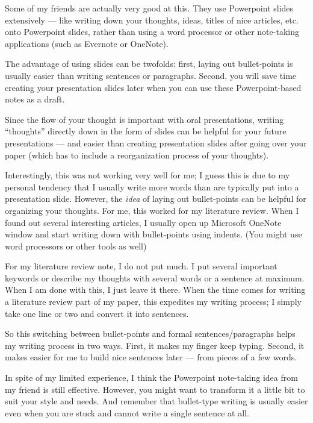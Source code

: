 \documentclass[11pt]{article}
\begin{document}
Some of my friends are actually very good at this. They use Powerpoint slides
extensively --- like writing down your thoughts, ideas, titles of nice
articles, etc. onto Powerpoint slides, rather than using a word processor or
other note-taking applications (such as Evernote or OneNote).

The advantage of using slides can be twofolds: first, laying out bullet-points
is usually easier than writing sentences or paragraphs. Second, you will save
time creating your presentation slides later when you can use these
Powerpoint-based notes as a draft.

Since the flow of your thought is important with oral presentations, writing
``thoughts'' directly down in the form of slides can be helpful for your
future presentations --- and easier than creating presentation slides
after going over your paper (which has to include a reorganization process of
your thoughts).

Interestingly, this was not working very well for me; I guess this is due to
my personal tendency that I usually write more words than are typically put
into a presentation slide. However, the \emph{idea} of laying out
bullet-points can be helpful for organizing your thoughts. For me, this worked
for my literature review. When I found out several interesting articles, I
usually open up Microsoft OneNote window and start writing down with
bullet-points using indents. (You might use word processors or other tools as
well)

For my literature review note, I do not put much. I put several important
keywords or describe my thoughts with several words or a sentence at maximum.
When I am done with this, I just leave it there.  When the time comes for 
writing a literature review part of my paper, this expedites my writing
process; I simply take one line or two and convert it into sentences.

So this switching between bullet-points and formal sentences/paragraphs helps
my writing process in two ways. First, it makes my finger keep typing. Second,
it makes easier for me to build nice sentences later --- from pieces of a
few words.

In spite of my limited experience, I think the Powerpoint note-taking idea
from my friend is still effective. However, you might want to transform it a
little bit to suit your style and needs. And remember that bullet-type writing
is usually easier even when you are stuck and cannot write a single sentence
at all.
\end{document}
